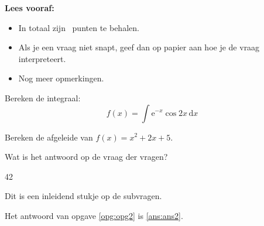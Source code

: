 \documentclass[12pt,dutch,addpoints]{tisdexam}
\begin{document}
\makecoverpage


\textbf{Lees vooraf:}
\begin{itemize}
\item In totaal zijn \numpoints\ punten te behalen.
\item Als je een vraag niet snapt, geef dan op papier aan hoe je de vraag interpreteert.
\item Nog meer opmerkingen.
\end{itemize}

\hrulefill

\begin{questions}


\question[5]
Bereken de integraal: \[f(x) = \int \mathrm{e}^{-x}\cos 2x \, \mathrm{d}x\]

\question[5]
Bereken de afgeleide van $f(x) = x^2+2x+5$.

\question[2]
\label{opg:opg2}
Wat is het antwoord op de vraag der vragen?
\begin{choices}
\CorrectChoice \label{ans:ans2} 42
\end{choices}

\question
Dit is een inleidend stukje op de subvragen.

\end{questions}

\hrulefill

Het antwoord van opgave \ref{opg:opg2} is \ref{ans:ans2}.
\end{document}
